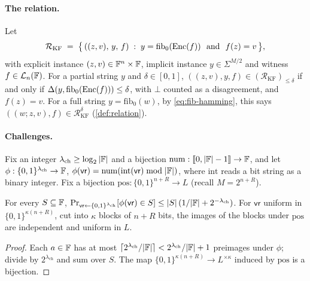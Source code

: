 \paragraph{The relation.}
Let
\[
  \mathcal{R}_{\mathrm{KF}} \;=\; \bigl\{\, ((z,v),\, y,\, f) \;:\; y = \mathrm{fib}_0(\mathrm{Enc}(f)) \ \text{ and } \ f(z) = v \,\bigr\},
\]
with explicit instance $(z,v) \in \mathbb{F}^n \times \mathbb{F}$, implicit instance $y \in \Sigma^{M/2}$ and witness $f \in \mathcal{L}_n(\mathbb{F})$.
For a partial string $y$ and $\delta \in [0,1]$, $((z,v), y, f) \in (\mathcal{R}_{\mathrm{KF}})_{\le\delta}$ if and only if $\Delta(y, \mathrm{fib}_0(\mathrm{Enc}(f))) \le \delta$, with $\bot$ counted as a disagreement, and $f(z) = v$.
For a full string $y = \mathrm{fib}_0(w)$, by \eqref{eq:fib-hamming}, this says $((w;z,v),f) \in \mathcal{R}^\delta_{\mathrm{KF}}$ (\cref{def:relation}).

\paragraph{Challenges.}
Fix an integer $\lambda_{\mathrm{ch}} \ge \log_2|\mathbb{F}|$ and a bijection $\mathrm{num} : \llbracket 0, |\mathbb{F}|-1 \rrbracket \to \mathbb{F}$, and let $\phi : \{0,1\}^{\lambda_{\mathrm{ch}}} \to \mathbb{F}$, $\phi(\mathsf{vr}) = \mathrm{num}(\mathrm{int}(\mathsf{vr}) \bmod |\mathbb{F}|)$, where $\mathrm{int}$ reads a bit string as a binary integer.
Fix a bijection $\mathrm{pos} : \{0,1\}^{n+R} \to L$ (recall $M = 2^{n+R}$).

\begin{lemma}[Sampling]\label{lem:sampling}
For every $S \subseteq \mathbb{F}$, $\Pr_{\mathsf{vr} \leftarrow \{0,1\}^{\lambda_{\mathrm{ch}}}}[\phi(\mathsf{vr}) \in S] \le |S|\,(1/|\mathbb{F}| + 2^{-\lambda_{\mathrm{ch}}})$.
For $\mathsf{vr}$ uniform in $\{0,1\}^{\kappa(n+R)}$, cut into $\kappa$ blocks of $n+R$ bits, the images of the blocks under $\mathrm{pos}$ are independent and uniform in $L$.
\end{lemma}

\begin{proof}
Each $a \in \mathbb{F}$ has at most $\lceil 2^{\lambda_{\mathrm{ch}}}/|\mathbb{F}| \rceil < 2^{\lambda_{\mathrm{ch}}}/|\mathbb{F}| + 1$ preimages under $\phi$; divide by $2^{\lambda_{\mathrm{ch}}}$ and sum over $S$.
The map $\{0,1\}^{\kappa(n+R)} \to L^{\times\kappa}$ induced by $\mathrm{pos}$ is a bijection.
\end{proof}

